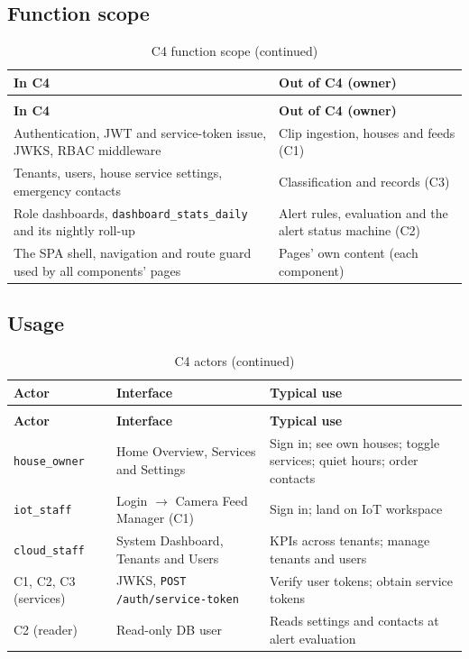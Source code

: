 \subsection{Function scope}
\begin{longtable}{L{6.4cm}L{8.4cm}}
\caption{C4 function scope}\label{tab:c4-scope}\\
\toprule
\textbf{In C4} & \textbf{Out of C4 (owner)} \\
\midrule
\endfirsthead
\caption[]{C4 function scope (continued)}\\
\toprule
\textbf{In C4} & \textbf{Out of C4 (owner)} \\
\midrule
\endhead
Authentication, JWT and service-token issue, JWKS, RBAC middleware & Clip ingestion, houses and feeds (C1) \\
Tenants, users, house service settings, emergency contacts & Classification and records (C3) \\
Role dashboards, \texttt{dashboard\_stats\_daily} and its nightly roll-up & Alert rules, evaluation and the alert status machine (C2) \\
The SPA shell, navigation and route guard used by all components' pages & Pages' own content (each component) \\
\bottomrule
\end{longtable}

\subsection{Usage}
\begin{longtable}{L{3.0cm}L{4.0cm}L{7.8cm}}
\caption{C4 actors}\label{tab:c4-actors}\\
\toprule
\textbf{Actor} & \textbf{Interface} & \textbf{Typical use} \\
\midrule
\endfirsthead
\caption[]{C4 actors (continued)}\\
\toprule
\textbf{Actor} & \textbf{Interface} & \textbf{Typical use} \\
\midrule
\endhead
\texttt{house\_owner} & Home Overview, Services and Settings & Sign in; see own houses; toggle services; quiet hours; order contacts \\
\texttt{iot\_staff} & Login $\rightarrow$ Camera Feed Manager (C1) & Sign in; land on IoT workspace \\
\texttt{cloud\_staff} & System Dashboard, Tenants and Users & KPIs across tenants; manage tenants and users \\
C1, C2, C3 (services) & JWKS, \texttt{POST /auth/service-token} & Verify user tokens; obtain service tokens \\
C2 (reader) & Read-only DB user & Reads settings and contacts at alert evaluation \\
\bottomrule
\end{longtable}

